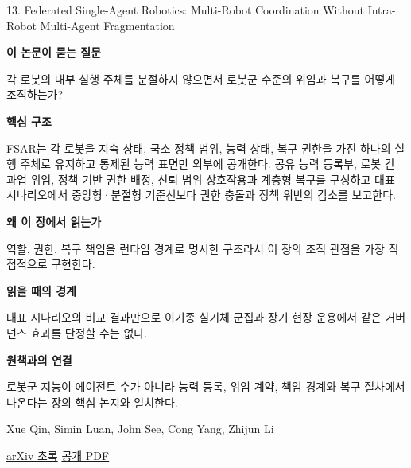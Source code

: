 \documentclass[11pt,openany]{book}
\begin{document}
\begin{termcard}{13. Federated Single-Agent Robotics: Multi-Robot Coordination Without Intra-Robot Multi-Agent Fragmentation}

\par

\medskip

{\sffamily\bfseries\color{deepblue} 이 논문이 묻는 질문}\par

각 로봇의 내부 실행 주체를 분절하지 않으면서 로봇군 수준의 위임과 복구를 어떻게 조직하는가?

\smallskip

{\sffamily\bfseries\color{deepblue} 핵심 구조}\par

FSAR는 각 로봇을 지속 상태, 국소 정책 범위, 능력 상태, 복구 권한을 가진 하나의 실행 주체로 유지하고 통제된 능력 표면만 외부에 공개한다. 공유 능력 등록부, 로봇 간 과업 위임, 정책 기반 권한 배정, 신뢰 범위 상호작용과 계층형 복구를 구성하고 대표 시나리오에서 중앙형·분절형 기준선보다 권한 충돌과 정책 위반의 감소를 보고한다.

\smallskip

{\sffamily\bfseries\color{deepblue} 왜 이 장에서 읽는가}\par

역할, 권한, 복구 책임을 런타임 경계로 명시한 구조라서 이 장의 조직 관점을 가장 직접적으로 구현한다.

\smallskip

{\sffamily\bfseries\color{coral} 읽을 때의 경계}\par

대표 시나리오의 비교 결과만으로 이기종 실기체 군집과 장기 현장 운용에서 같은 거버넌스 효과를 단정할 수는 없다.

\smallskip

{\sffamily\bfseries\color{teal} 원책과의 연결}\par

로봇군 지능이 에이전트 수가 아니라 능력 등록, 위임 계약, 책임 경계와 복구 절차에서 나온다는 장의 핵심 논지와 일치한다.

\medskip

{\footnotesize\color{muted} Xue Qin, Simin Luan, John See, Cong Yang, Zhijun Li\par

\href{https://arxiv.org/abs/2604.11028}{arXiv 초록} \quad \href{https://arxiv.org/pdf/2604.11028}{공개 PDF}\par}

\end{termcard}
\end{document}
